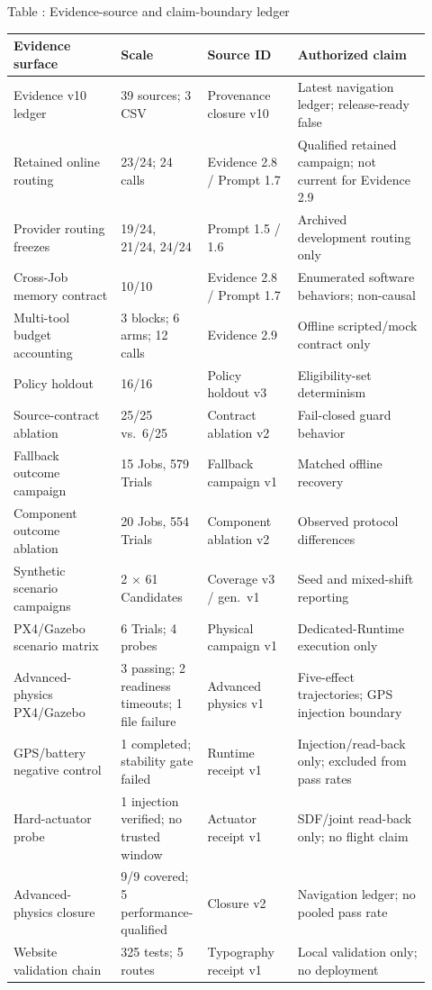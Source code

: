 \begingroup
\footnotesize
\renewcommand{\arraystretch}{0.92}
\begin{center}
\begin{minipage}{\linewidth}
\centering
{}\textnormal{Table \thetable: Evidence-source and claim-boundary ledger}\par
\vspace{0.12em}
\begin{tabular}{@{}L{0.25\linewidth}C{0.15\linewidth}L{0.21\linewidth}L{0.31\linewidth}@{}}
\toprule
\textbf{Evidence surface} & \textbf{Scale} &
\textbf{Source ID} & \textbf{Authorized claim}\tabularnewline
\midrule
Evidence v10 ledger & 39 sources; 3 CSV & Provenance closure v10 &
Latest navigation ledger; release-ready false\tabularnewline
Retained online routing & 23/24; 24 calls & Evidence 2.8 / Prompt 1.7 &
Qualified retained campaign; not current for Evidence 2.9\tabularnewline
Provider routing freezes & 19/24, 21/24, 24/24 & Prompt 1.5 / 1.6 &
Archived development routing only\tabularnewline
Cross-Job memory contract & 10/10 & Evidence 2.8 / Prompt 1.7 &
Enumerated software behaviors; non-causal\tabularnewline
Multi-tool budget accounting & 3 blocks; 6 arms; 12 calls & Evidence 2.9 &
Offline scripted/mock contract only\tabularnewline
Policy holdout & 16/16 & Policy holdout v3 &
Eligibility-set determinism\tabularnewline
Source-contract ablation & 25/25 vs.\ 6/25 & Contract ablation v2 &
Fail-closed guard behavior\tabularnewline
Fallback outcome campaign & 15 Jobs, 579 Trials & Fallback campaign v1 &
Matched offline recovery\tabularnewline
Component outcome ablation & 20 Jobs, 554 Trials & Component ablation v2 &
Observed protocol differences\tabularnewline
Synthetic scenario campaigns & 2 $\times$ 61 Candidates &
Coverage v3 / gen.\ v1 &
Seed and mixed-shift reporting\tabularnewline
PX4/Gazebo scenario matrix & 6 Trials; 4 probes & Physical campaign v1 &
Dedicated-Runtime execution only\tabularnewline
Advanced-physics PX4/Gazebo & 3 passing; 2 readiness timeouts; 1 file failure &
Advanced physics v1 & Five-effect trajectories; GPS injection boundary\tabularnewline
GPS/battery negative control & 1 completed; stability gate failed &
Runtime receipt v1 & Injection/read-back only; excluded from pass rates\tabularnewline
Hard-actuator probe & 1 injection verified; no trusted window &
Actuator receipt v1 & SDF/joint read-back only; no flight claim\tabularnewline
Advanced-physics closure & 9/9 covered; 5 performance-qualified &
Closure v2 & Navigation ledger; no pooled pass rate\tabularnewline
Website validation chain & 325 tests; 5 routes & Typography receipt v1 &
Local validation only; no deployment\tabularnewline
\bottomrule
\end{tabular}
\end{minipage}
\end{center}
\endgroup

